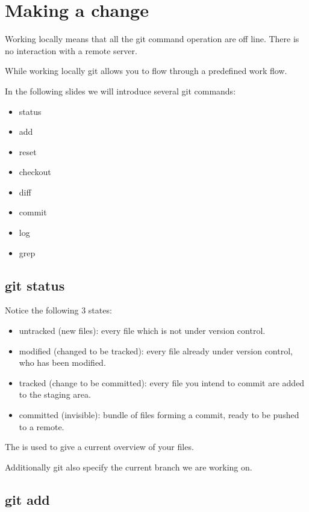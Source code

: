\section{Making a change}
\begin{frame}[fragile]
    \slidetitle

Working locally means that all the git command operation are off line.
There is no interaction with a remote server.

While working locally git allows you to flow through a predefined work flow.


In the following slides we will introduce several git commands:
\begin{itemize}
\item status
\item add
\item reset
\item checkout
\item diff
\item commit
\item log
\item grep
\end{itemize}
\end{frame}

\subsection{git status}
\begin{frame}[fragile]
    \subslidetitle
Notice the following 3 states:
\begin{itemize}
\item untracked (new files): every file which is not under version control.
\item modified (changed to be tracked): every file already under version control, who has been modified.
\item tracked (change to be committed): every file you intend to commit are added to the staging area.
\item committed (invisible): bundle of files forming a commit, ready to be pushed to a remote.
\end{itemize}

The  is used to give a current overview of your files.

Additionally git also specify the current branch we are working on.
\end{frame}

\subsection{git add}
\begin{frame}[fragile]
    \subslidetitle
\end{frame}

